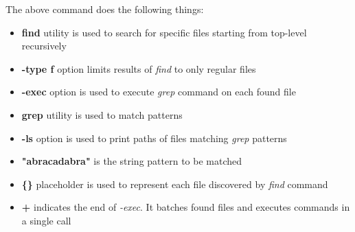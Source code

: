 \documentclass{article}
\begin{document}
The above command does the following things:
\begin{itemize}
    \item \textbf{find} utility is used to search for specific files starting from top-level recursively
    \item \textbf{-type f} option limits results of \textit{find} to only regular files
    \item \textbf{-exec} option is used to execute \textit{grep} command on each found file
    \item \textbf{grep} utility is used to match patterns
    \item \textbf{-ls} option is used to print paths of files matching \textit{grep} patterns
    \item \textbf{"abracadabra"} is the string pattern to be matched
    \item \textbf{\{\}} placeholder is used to represent each file discovered by \textit{find} command
    \item \textbf{+} indicates the end of \textit{-exec}. It batches found files and executes commands in a single call
\end{itemize}
\end{document}
